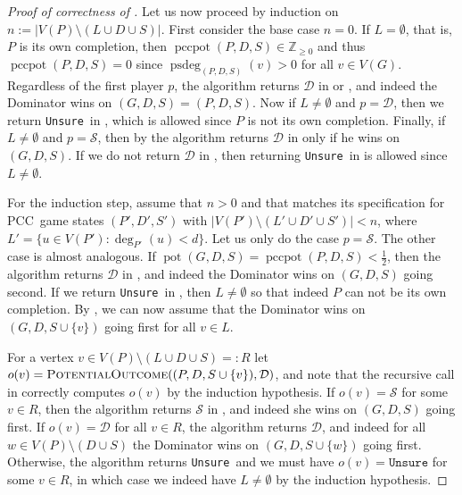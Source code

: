 \documentclass[a4paper,11pt,oneside]{scrartcl}
\theoremstyle{definition}
\theoremstyle{remark}
\newcommand{\Z}{\mathbb{Z}}
\DeclareMathOperator{\pot}{pot}
\DeclareMathOperator{\pccgsdeg}{psdeg}
\DeclareMathOperator{\pccpot}{pccpot}
\newcommand{\pcc}{PCC}
\newcommand{\pccgs}{\pcc\ game state}
\newcommand{\unsure}{\texttt{Unsure}}
\begin{document}
\begin{proof}[Proof of correctness of ]
    Let us now proceed by induction on $n := |V(P) \setminus (L \cup D \cup S)|$. First consider the base case $n = 0$. If $L = \emptyset$, that is, $P$ is its own completion, then $\pccpot(P,D,S) \in \Z_{\geq 0}$ and thus $\pccpot(P,D,S) = 0$ since $\pccgsdeg_{(P,D,S)}(v)> 0$ for all $v \in V(G)$. Regardless of the first player $p$, the algorithm returns $\mathcal D$ in  or , and indeed the Dominator wins on $(G,D,S) = (P,D,S)$. Now if $L \neq \emptyset$ and $p = \mathcal D$, then we return \unsure\ in , which is allowed since $P$ is not its own completion. Finally, if $L \neq \emptyset$ and $p = \mathcal S$, then by  the algorithm returns $\mathcal D$ in  only if he wins on $(G,D,S)$. If we do not return $\mathcal D$ in , then returning \unsure\ in  is allowed since $L \neq \emptyset$.

    For the induction step, assume that $n > 0$ and that  matches its specification for \pccgs s $(P',D',S')$ with $|V(P') \setminus (L' \cup D' \cup S')| < n$, where $L' = \{u \in V(P') : \deg_{P'}(u) < d\}$. Let us only do the case $p = \mathcal S$. The other case is almost analogous. If $\pot(G,D,S) = \pccpot(P,D,S) < \frac 12$, then the algorithm returns $\mathcal D$ in , and indeed the Dominator wins on $(G,D,S)$ going second. If we return \unsure\ in , then $L \neq \emptyset$ so that indeed $P$ can not be its own completion. By , we can now assume that the Dominator wins on $(G,D,S\cup \{v\})$ going first for all $v \in L$.
    
    For a vertex $v \in V(P) \setminus (L \cup D \cup S)=:R$ let $o(v) = \textsc{PotentialOutcome}((P, D, S \cup \{v\}), \mathcal D)$, and note that the recursive call in  correctly computes $o(v)$ by the induction hypothesis. If $o(v) = \mathcal S$ for some $v \in R$, then the algorithm returns $\mathcal S$ in , and indeed she wins on $(G,D,S)$ going first. If $o(v) = \mathcal D$ for all $v \in R$, the algorithm returns $\mathcal D$, and indeed for all $w \in V(P) \setminus (D \cup S)$ the Dominator wins on $(G,D,S\cup \{w\})$ going first. Otherwise, the algorithm returns \unsure\ and we must have $o(v) = \unsure$ for some $v \in R$, in which case we indeed have $L \neq \emptyset$ by the induction hypothesis. 
\end{proof}
\end{document}

